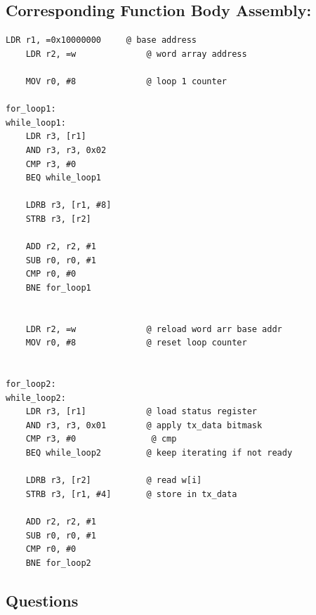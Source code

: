 \documentclass[14pt, a4paper]{article}
\begin{document}
\vspace{5mm}

\subsection*{Corresponding Function Body Assembly:}

\begin{lstlisting}[style=asmstyle]
    LDR r1, =0x10000000     @ base address
    LDR r2, =w              @ word array address

    MOV r0, #8              @ loop 1 counter

for_loop1:
while_loop1:
    LDR r3, [r1]
    AND r3, r3, 0x02
    CMP r3, #0
    BEQ while_loop1

    LDRB r3, [r1, #8]
    STRB r3, [r2]

    ADD r2, r2, #1
    SUB r0, r0, #1
    CMP r0, #0
    BNE for_loop1


    LDR r2, =w              @ reload word arr base addr
    MOV r0, #8              @ reset loop counter


for_loop2:
while_loop2:
    LDR r3, [r1]            @ load status register
    AND r3, r3, 0x01        @ apply tx_data bitmask
    CMP r3, #0               @ cmp
    BEQ while_loop2         @ keep iterating if not ready

    LDRB r3, [r2]           @ read w[i]
    STRB r3, [r1, #4]       @ store in tx_data

    ADD r2, r2, #1
    SUB r0, r0, #1
    CMP r0, #0
    BNE for_loop2
\end{lstlisting}

\subsection*{Questions}
\end{document}
